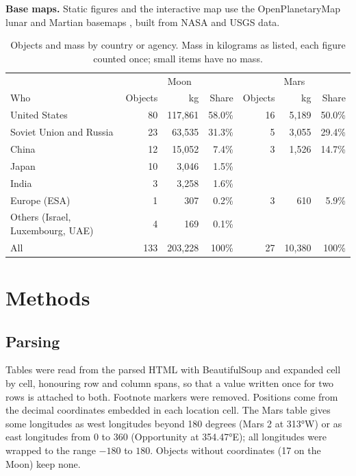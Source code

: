 \documentclass[11pt,a4paper]{article}
\begin{document}
\textbf{Base maps.} Static figures and the interactive map use the OpenPlanetaryMap lunar and Martian basemaps \citep{opm}, built from NASA and USGS data.

\begin{table}[tbp]\centering\small\caption{Objects and mass by country or agency. Mass in kilograms as listed, each figure counted once; small items have no mass.}\label{tab:mass}\begin{tabular}{lrrrrrr}\toprule & \multicolumn{3}{c}{Moon} & \multicolumn{3}{c}{Mars}\\ Who & Objects & kg & Share & Objects & kg & Share\\\midrule
United States & 80 & 117,861 & 58.0\% & 16 & 5,189 & 50.0\%\\
Soviet Union and Russia & 23 & 63,535 & 31.3\% & 5 & 3,055 & 29.4\%\\
China & 12 & 15,052 & 7.4\% & 3 & 1,526 & 14.7\%\\
Japan & 10 & 3,046 & 1.5\% & & &\\
India & 3 & 3,258 & 1.6\% & & &\\
Europe (ESA) & 1 & 307 & 0.2\% & 3 & 610 & 5.9\%\\
Others (Israel, Luxembourg, UAE) & 4 & 169 & 0.1\% & & &\\
\midrule All & 133 & 203,228 & 100\% & 27 & 10,380 & 100\%\\
\bottomrule\end{tabular}\end{table}

\section{Methods}
\subsection{Parsing}
Tables were read from the parsed HTML with BeautifulSoup and expanded cell by cell, honouring row and column spans, so that a value written once for two rows is attached to both. Footnote markers were removed. Positions come from the decimal coordinates embedded in each location cell. The Mars table gives some longitudes as west longitudes beyond 180 degrees (Mars 2 at 313°W) or as east longitudes from 0 to 360 (Opportunity at 354.47°E); all longitudes were wrapped to the range $-180$ to $180$. Objects without coordinates (17 on the Moon) keep none.
\end{document}
